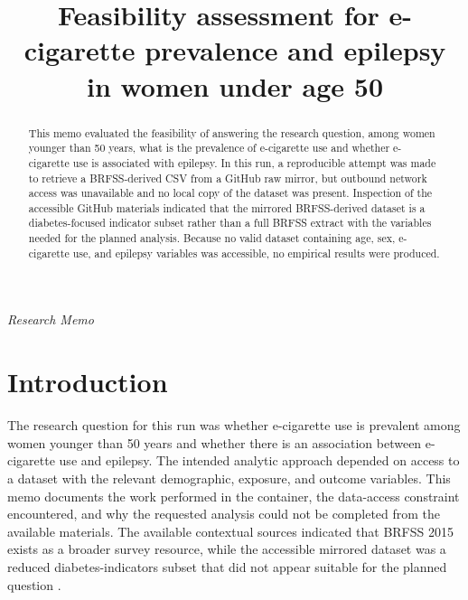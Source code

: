 \documentclass[11pt]{article}
\title{Feasibility assessment for e-cigarette prevalence and epilepsy in women under age 50}
\author{}
\date{}
\begin{document}
\maketitle

\begin{center}\small\textit{Research Memo}\end{center}

\begin{abstract}

This memo evaluated the feasibility of answering the research question, among women younger than 50 years, what is the prevalence of e-cigarette use and whether e-cigarette use is associated with epilepsy. In this run, a reproducible attempt was made to retrieve a BRFSS-derived CSV from a GitHub raw mirror, but outbound network access was unavailable and no local copy of the dataset was present. Inspection of the accessible GitHub materials indicated that the mirrored BRFSS-derived dataset is a diabetes-focused indicator subset rather than a full BRFSS extract with the variables needed for the planned analysis. Because no valid dataset containing age, sex, e-cigarette use, and epilepsy variables was accessible, no empirical results were produced.

\end{abstract}

\section{Introduction}
The research question for this run was whether e-cigarette use is prevalent among women younger than 50 years and whether there is an association between e-cigarette use and epilepsy. The intended analytic approach depended on access to a dataset with the relevant demographic, exposure, and outcome variables. This memo documents the work performed in the container, the data-access constraint encountered, and why the requested analysis could not be completed from the available materials. The available contextual sources indicated that BRFSS 2015 exists as a broader survey resource, while the accessible mirrored dataset was a reduced diabetes-indicators subset that did not appear suitable for the planned question \cite{ref2} \cite{ref1}.
\end{document}
